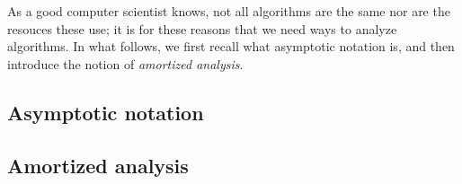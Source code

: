 \documentclass{subfiles}
\begin{document}
    As a good computer scientist knows, 
        not all algorithms are the same nor are the resouces these use;
        it is for these reasons that we need ways to analyze algorithms.
        In what follows, we first recall what asymptotic notation is,
        and then introduce the notion of \emph{amortized analysis}.

    \subsection{Asymptotic notation}
    

    \subsection{Amortized analysis}
    
\end{document}
